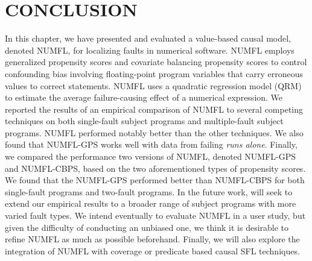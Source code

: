 \section{CONCLUSION}\label{conclusion}
In this chapter, we have presented and evaluated a value-based causal model, denoted NUMFL, for localizing faults in numerical software. NUMFL employs generalized propensity scores and covariate balancing propensity scores to control confounding bias involving floating-point program variables that carry erroneous values to correct statements.  NUMFL uses a quadratic regression model (QRM) to estimate the average failure-causing effect of a numerical expression.  We reported the results of an empirical comparison of NUMFL to several competing techniques on both single-fault subject programs and multiple-fault subject programs.  NUMFL performed notably better than the other techniques. We also found that NUMFL-GPS works well with data from failing {\it runs alone}.  Finally, we compared the performance two versions of NUMFL, denoted NUMFL-GPS and NUMFL-CBPS, based on the two aforementioned types of propensity scores. We found that the NUMFL-GPS performed better than NUMFL-CBPS for both single-fault programs and two-fault programs.   In the future work, will seek to extend our empirical results to a broader range of subject programs with more varied fault types.  We intend eventually to evaluate NUMFL in a user study, but given the difficulty of conducting an unbiased one, we think it is desirable to refine NUMFL as much as possible beforehand.  Finally, we will also explore the integration of NUMFL with coverage or predicate based causal SFL techniques. 
